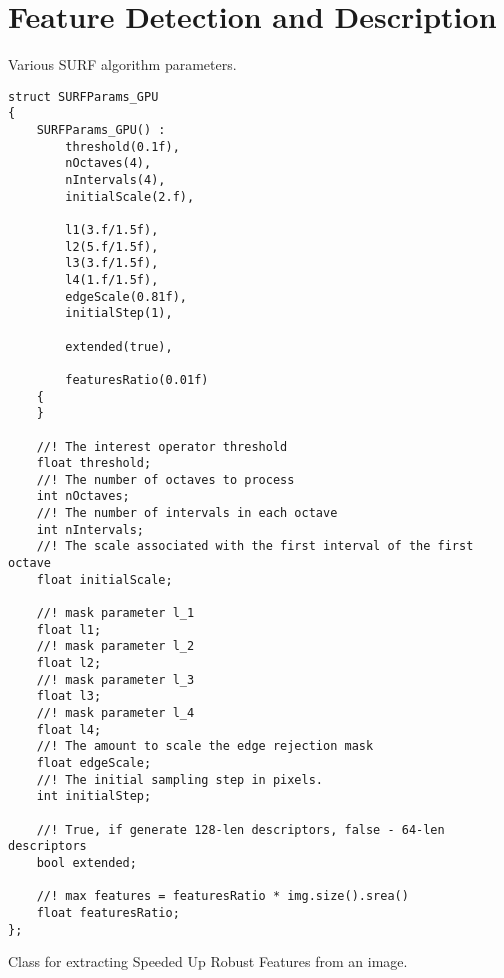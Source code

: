 \section{Feature Detection and Description}


Various SURF algorithm parameters. 

\begin{lstlisting}
struct SURFParams_GPU 
{
    SURFParams_GPU() :
        threshold(0.1f), 
        nOctaves(4),
        nIntervals(4),
        initialScale(2.f),

        l1(3.f/1.5f),
        l2(5.f/1.5f),
        l3(3.f/1.5f),
        l4(1.f/1.5f),
        edgeScale(0.81f),
        initialStep(1),

        extended(true),

        featuresRatio(0.01f)
    {
    }

    //! The interest operator threshold
    float threshold;
    //! The number of octaves to process
    int nOctaves;
    //! The number of intervals in each octave
    int nIntervals;
    //! The scale associated with the first interval of the first octave
    float initialScale;

    //! mask parameter l_1
    float l1;
    //! mask parameter l_2 
    float l2;
    //! mask parameter l_3
    float l3;
    //! mask parameter l_4
    float l4;
    //! The amount to scale the edge rejection mask
    float edgeScale;
    //! The initial sampling step in pixels.
    int initialStep;

    //! True, if generate 128-len descriptors, false - 64-len descriptors
    bool extended;

    //! max features = featuresRatio * img.size().srea()
    float featuresRatio;
};
\end{lstlisting}


Class for extracting Speeded Up Robust Features from an image.

